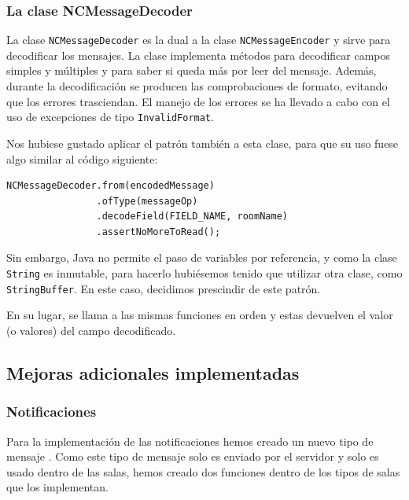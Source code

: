 
\subsubsection*{La clase NCMessageDecoder}
La clase \lstinline!NCMessageDecoder! es la dual a la clase \lstinline!NCMessageEncoder! y sirve para decodificar los mensajes. La clase implementa métodos para decodificar campos simples y múltiples y para saber si queda más por leer del mensaje. Además, durante la decodificación se producen las comprobaciones de formato, evitando que los errores trasciendan. El manejo de los errores se ha llevado a cabo con el uso de excepciones de tipo \lstinline!InvalidFormat!.

Nos hubiese gustado aplicar el patrón  también a esta clase, para que su uso fuese algo similar al código siguiente:

\begin{lstlisting}[style=JavaStyle]
NCMessageDecoder.from(encodedMessage)
                .ofType(messageOp)
                .decodeField(FIELD_NAME, roomName)
                .assertNoMoreToRead();
\end{lstlisting}

Sin embargo, Java no permite el paso de variables por referencia, y como la clase \lstinline!String! es inmutable, para hacerlo hubiésemos tenido que utilizar otra clase, como \lstinline!StringBuffer!. En este caso, decidimos prescindir de este patrón.

En su lugar, se llama a las mismas funciones en orden y estas devuelven el valor (o valores) del campo decodificado.


\subsection{Mejoras adicionales implementadas}
\subsubsection{Notificaciones}
Para la implementación de las notificaciones hemos creado un nuevo tipo de mensaje . Como este tipo de mensaje solo es enviado por el servidor y solo es usado dentro de las salas, hemos creado dos funciones dentro de los tipos de salas que los implementan.



